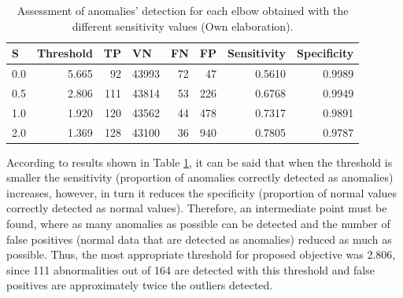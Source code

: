 \begin{table}[H]
\centering
\begin{center}
\begin{tabular}{|l|r|r|r|r|r|r|r|}
\hline
\textbf{S} & \multicolumn{1}{l|}{\textbf{Threshold}} & \multicolumn{1}{l|}{\textbf{TP}} & \multicolumn{1}{l|}{\textbf{VN}}& \multicolumn{1}{l|}{\textbf{FN}}& \multicolumn{1}{l|}{\textbf{FP}} & \multicolumn{1}{l|}{\textbf{Sensitivity}} & \multicolumn{1}{l|}{\textbf{Specificity}} \\ \hline
0.0 & 5.665 & \cellcolor[HTML]{AADD99} 92 & \cellcolor[HTML]{AADD99} 43993 & \cellcolor[HTML]{FFCE93} 72 & \cellcolor[HTML]{FFCE93} 47 & 0.5610 & 0.9989 \\ \hline
0.5  & 2.806 & \cellcolor[HTML]{AADD99} 111 & \cellcolor[HTML]{AADD99} 43814 & \cellcolor[HTML]{FFCE93} 53 & \cellcolor[HTML]{FFCE93} 226 & 0.6768 & 0.9949 \\ \hline
1.0 &  1.920 & \cellcolor[HTML]{AADD99} 120 & \cellcolor[HTML]{AADD99} 43562 & \cellcolor[HTML]{FFCE93} 44 & \cellcolor[HTML]{FFCE93} 478 & 0.7317 & 0.9891 \\ \hline
2.0 & 1.369	 & \cellcolor[HTML]{AADD99} 128 & \cellcolor[HTML]{AADD99} 43100  & \cellcolor[HTML]{FFCE93} 36 & \cellcolor[HTML]{FFCE93} 940 & 0.7805 & 0.9787 \\ \hline
\end{tabular}
\end{center}
\caption{Assessment of anomalies' detection for each elbow obtained with the different sensitivity values (Own elaboration).}
\label{table:evaluacion_codos}
\end{table}

According to results shown in Table \ref{table:evaluacion_codos}, it can be said that when the threshold is smaller the sensitivity (proportion of anomalies correctly detected as anomalies) increases, however, in turn it reduces the specificity (proportion of normal values correctly detected as normal values). Therefore, an intermediate point must be found, where as many anomalies as possible can be detected and the number of false positives (normal data that are detected as anomalies) reduced as much as possible. Thus, the most appropriate threshold for proposed objective was 2.806, since 111 abnormalities out of 164 are detected with this threshold and false positives are approximately twice the outliers detected.

